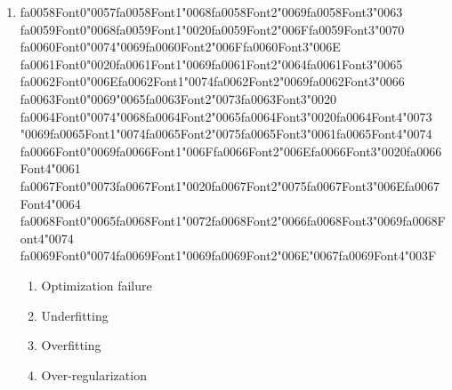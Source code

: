 \documentclass[12pt]{article}
\begin{document}
\begin{enumerate}[label=Q\arabic*.]
 \begin{enumerate}[label=(\Alph*)]
     \item Bag-of-Words representation assumes term independence
     \item IDF overweights rare tokens
     \item Document length normalization distorts similarity
     \item Cosine similarity ignores magnitude differences
 \end{enumerate}
 
 \item {\csname fa0058Font0\endcsname\char"0057}{\csname fa0058Font1\endcsname\char"0068}{\csname fa0058Font2\endcsname\char"0069}{\csname fa0058Font3\endcsname\char"0063} {\csname fa0059Font0\endcsname\char"0068}{\csname fa0059Font1\endcsname\char"0020}{\csname fa0059Font2\endcsname\char"006F}{\csname fa0059Font3\endcsname\char"0070} {\csname fa0060Font0\endcsname\char"0074}{\char"0069}{\csname fa0060Font2\endcsname\char"006F}{\csname fa0060Font3\endcsname\char"006E} {\csname fa0061Font0\endcsname\char"0020}{\csname fa0061Font1\endcsname\char"0069}{\csname fa0061Font2\endcsname\char"0064}{\csname fa0061Font3\endcsname\char"0065} {\csname fa0062Font0\endcsname\char"006E}{\csname fa0062Font1\endcsname\char"0074}{\csname fa0062Font2\endcsname\char"0069}{\csname fa0062Font3\endcsname\char"0066} {\csname fa0063Font0\endcsname\char"0069}{\char"0065}{\csname fa0063Font2\endcsname\char"0073}{\csname fa0063Font3\endcsname\char"0020} {\csname fa0064Font0\endcsname\char"0074}{\char"0068}{\csname fa0064Font2\endcsname\char"0065}{\csname fa0064Font3\endcsname\char"0020}{\csname fa0064Font4\endcsname\char"0073} {\char"0069}{\csname fa0065Font1\endcsname\char"0074}{\csname fa0065Font2\endcsname\char"0075}{\csname fa0065Font3\endcsname\char"0061}{\csname fa0065Font4\endcsname\char"0074} {\csname fa0066Font0\endcsname\char"0069}{\csname fa0066Font1\endcsname\char"006F}{\csname fa0066Font2\endcsname\char"006E}{\csname fa0066Font3\endcsname\char"0020}{\csname fa0066Font4\endcsname\char"0061} {\csname fa0067Font0\endcsname\char"0073}{\csname fa0067Font1\endcsname\char"0020}{\csname fa0067Font2\endcsname\char"0075}{\csname fa0067Font3\endcsname\char"006E}{\csname fa0067Font4\endcsname\char"0064} {\csname fa0068Font0\endcsname\char"0065}{\csname fa0068Font1\endcsname\char"0072}{\csname fa0068Font2\endcsname\char"0066}{\csname fa0068Font3\endcsname\char"0069}{\csname fa0068Font4\endcsname\char"0074} {\csname fa0069Font0\endcsname\char"0074}{\csname fa0069Font1\endcsname\char"0069}{\csname fa0069Font2\endcsname\char"006E}{\char"0067}{\csname fa0069Font4\endcsname\char"003F}
 \begin{enumerate}[label=(\Alph*)]
     \item Optimization failure
     \item Underfitting
     \item Overfitting
     \item Over-regularization
 \end{enumerate}
 

\end{enumerate}
\end{document}
